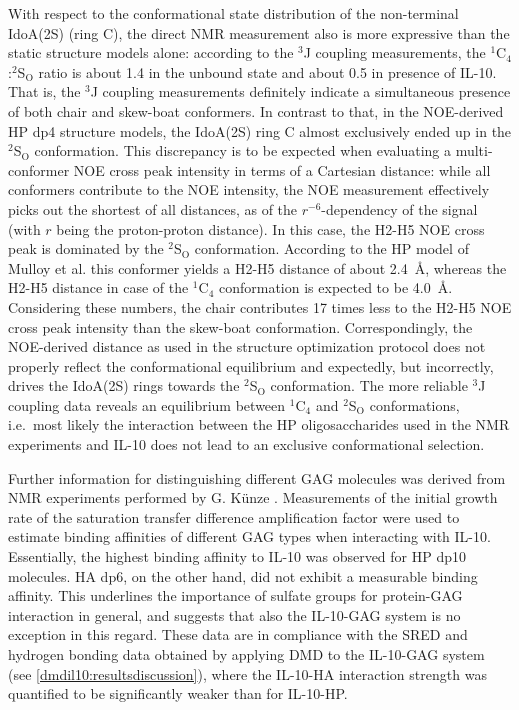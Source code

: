 With respect to the conformational state distribution of the non-terminal
IdoA(2S) (ring C), the direct NMR measurement also is more expressive than the
static structure models alone: according to the ${}^{3}$J coupling measurements,
the ${}^1$C${}_4$:${}^2$S${}_\mathrm{O}$ ratio is about 1.4 in the unbound state
and about 0.5 in presence of IL-10. That is, the ${}^{3}$J coupling measurements
definitely indicate a simultaneous presence of both chair and skew-boat
conformers. In contrast to that, in the NOE-derived HP dp4 structure models, the
IdoA(2S) ring C almost exclusively ended up in the  ${}^2$S${}_\mathrm{O}$
conformation. This discrepancy is to be expected when evaluating a
multi-conformer NOE cross peak intensity in terms of a Cartesian distance: while
all conformers contribute to the NOE intensity, the NOE measurement effectively
picks out the shortest of all distances, as of the $r^{-6}$-dependency of the
signal (with $r$ being the proton-proton distance). In this case, the H2-H5 NOE
cross peak is dominated by the ${}^2$S${}_\mathrm{O}$ conformation. According to
the HP model of Mulloy et al. \cite{foster_mulloy_1993} this conformer yields a
H2-H5 distance of about \SI{2.4}{\angstrom}, whereas the H2-H5 distance in case
of the ${}^1$C${}_4$ conformation is expected to be \SI{4.0}{\angstrom}.
Considering these numbers, the chair contributes 17 times less to the H2-H5 NOE
cross peak intensity than the skew-boat conformation. Correspondingly, the
NOE-derived distance as used in the structure optimization protocol does not
properly reflect the conformational equilibrium and expectedly, but incorrectly,
drives the IdoA(2S) rings towards the ${}^2$S${}_\mathrm{O}$ conformation. The
more reliable ${}^{3}$J coupling data reveals an equilibrium between
${}^1$C${}_4$ and ${}^2$S${}_\mathrm{O}$ conformations, i.e.\ most likely the
interaction between the HP oligosaccharides used in the NMR experiments and
IL-10 does not lead to an exclusive conformational selection.

Further information for distinguishing different GAG molecules was derived from
NMR experiments performed by G. Künze \cite{kuenze_gehrcke_2014}. Measurements
of the initial growth rate of the saturation transfer difference amplification
factor were used to estimate binding affinities of different GAG types when
interacting with IL-10. Essentially, the highest binding affinity to IL-10 was
observed for HP dp10 molecules. HA dp6, on the other hand, did not exhibit a
measurable binding affinity. This underlines the importance of sulfate groups
for protein-GAG interaction in general, and suggests that also the IL-10-GAG
system is no exception in this regard. These data are in compliance with the
SRED and hydrogen bonding data obtained by applying DMD to the IL-10-GAG system
(see \cref{dmdil10:resultsdiscussion}), where the IL-10-HA interaction strength
was quantified to be significantly weaker than for IL-10-HP.

